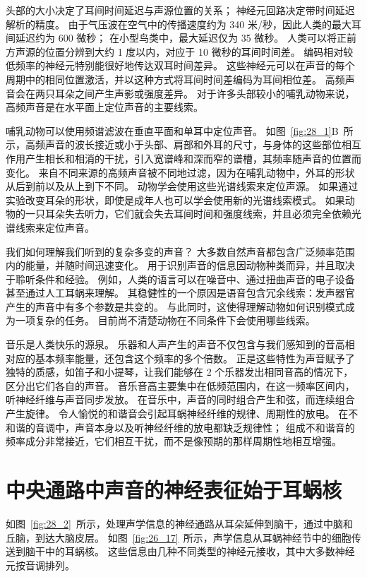 头部的大小决定了耳间时间延迟与声源位置的关系； 神经元回路决定带时间延迟解析的精度。
由于气压波在空气中的传播速度约为 340 米/秒，因此人类的最大耳间延迟约为 600 微秒；
在小型鸟类中，最大延迟仅为 35 微秒。
人类可以将正前方声源的位置分辨到大约 1 度以内，对应于 10 微秒的耳间时间差。
编码相对较低频率的神经元特别能很好地传达双耳时间差异。
这些神经元可以在声音的每个周期中的相同位置激活，并以这种方式将耳间时间差编码为耳间相位差。
高频声音会在两只耳朵之间产生声影或强度差异。
对于许多头部较小的哺乳动物来说，高频声音是在水平面上定位声音的主要线索。


哺乳动物可以使用频谱滤波在垂直平面和单耳中定位声音。
如图~\ref{fig:28_1}B~所示，高频声音的波长接近或小于头部、肩部和外耳的尺寸，与身体的这些部位相互作用产生相长和相消的干扰，引入宽谱峰和深而窄的谱槽，其频率随声音的位置而变化。
来自不同来源的高频声音被不同地过滤，因为在哺乳动物中，外耳的形状从后到前以及从上到下不同。
动物学会使用这些光谱线索来定位声源。
如果通过实验改变耳朵的形状，即使是成年人也可以学会使用新的光谱线索模式。
如果动物的一只耳朵失去听力，它们就会失去耳间时间和强度线索，并且必须完全依赖光谱线索来定位声音。


我们如何理解我们听到的复杂多变的声音？
大多数自然声音都包含广泛频率范围内的能量，并随时间迅速变化。
用于识别声音的信息因动物种类而异，并且取决于聆听条件和经验。
例如，人类的语言可以在噪音中、通过扭曲声音的电子设备甚至通过人工耳蜗来理解。
其稳健性的一个原因是语音包含冗余线索：发声器官产生的声音中有多个参数是共变的。
与此同时，这使得理解动物如何识别模式成为一项复杂的任务。
目前尚不清楚动物在不同条件下会使用哪些线索。


音乐是人类快乐的源泉。
乐器和人声产生的声音不仅包含与我们感知到的音高相对应的基本频率能量，还包含这个频率的多个倍数。
正是这些特性为声音赋予了独特的质感，如笛子和小提琴，让我们能够在 2 个乐器发出相同音高的情况下，区分出它们各自的声音。
音乐音高主要集中在低频范围内，在这一频率区间内，听神经纤维与声音同步发放。
在音乐中，声音的同时组合产生和弦，而连续组合产生旋律。
令人愉悦的和谐音会引起耳蜗神经纤维的规律、周期性的放电。
在不和谐的音调中，声音本身以及听神经纤维的放电都缺乏规律性；
组成不和谐音的频率成分非常接近，它们相互干扰，而不是像预期的那样周期性地相互增强。



\section{中央通路中声音的神经表征始于耳蜗核}

如图~\ref{fig:28_2}~所示，处理声学信息的神经通路从耳朵延伸到脑干，通过中脑和丘脑，到达大脑皮层。
如图~\ref{fig:26_17}~所示，声学信息从耳蜗神经节中的细胞传送到脑干中的耳蜗核。
这些信息由几种不同类型的神经元接收，其中大多数神经元按音调排列。


